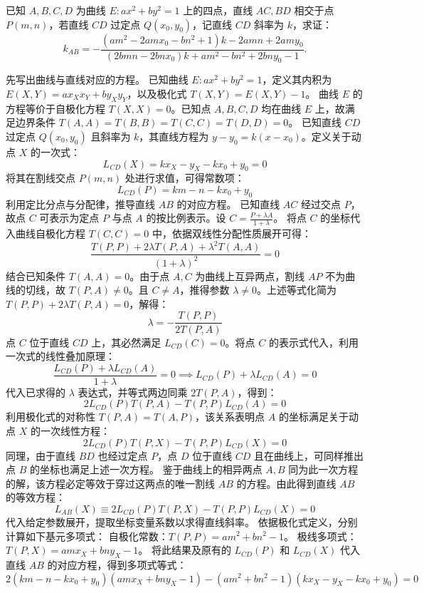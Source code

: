\begin{example}
已知 \(A,B,C,D\) 为曲线 \(E: ax^2 + by^2 = 1\) 上的四点，直线 \(AC,BD\) 相交于点 \(P(m,n)\)，若直线 \(CD\) 过定点 \(Q(x_0,y_0)\)，记直线 \(CD\) 斜率为 \(k\)，求证：
\[
k_{AB} = -\frac{\left(am^2 - 2amx_0 - bn^2 + 1\right)k - 2amn + 2amy_0}{\left(2bmn - 2bnx_0\right)k + am^2 - bn^2 + 2bny_0 - 1}.
\]
\end{example}
\begin{solution}
先写出曲线与直线对应的方程。
已知曲线 $E: ax^2 + by^2 = 1$，定义其内积为 $E(X,Y) = a x_X x_Y + b y_X y_Y$，以及极化式 $T(X,Y) = E(X,Y) - 1$。
曲线 $E$ 的方程等价于自极化方程 $T(X,X) = 0$。已知点 $A,B,C,D$ 均在曲线 $E$ 上，故满足边界条件 $T(A,A) = T(B,B) = T(C,C) = T(D,D) = 0$。
已知直线 $CD$ 过定点 $Q(x_0,y_0)$ 且斜率为 $k$，其直线方程为 $y - y_0 = k(x - x_0)$。定义关于动点 $X$ 的一次式：
\[ L_{CD}(X) = kx_X - y_X - kx_0 + y_0 = 0 \]
将其在割线交点 $P(m,n)$ 处进行求值，可得常数项：
\[ L_{CD}(P) = km - n - kx_0 + y_0 \]
利用定比分点与分配律，推导直线 $AB$ 的对应方程。
已知直线 $AC$ 经过交点 $P$，故点 $C$ 可表示为定点 $P$ 与点 $A$ 的按比例表示。设 $C = \frac{P + \lambda A}{1+\lambda}$。
将点 $C$ 的坐标代入曲线自极化方程 $T(C,C) = 0$ 中，依据双线性分配性质展开可得：
\[ \frac{T(P,P) + 2\lambda T(P,A) + \lambda^2 T(A,A)}{(1+\lambda)^2} = 0 \]
结合已知条件 $T(A,A) = 0$。由于点 $A,C$ 为曲线上互异两点，割线 $AP$ 不为曲线的切线，故 $T(P,A) \neq 0$。且 $C \neq A$，推得参数 $\lambda \neq 0$。上述等式化简为 $T(P,P) + 2\lambda T(P,A) = 0$，解得：
\[ \lambda = -\frac{T(P,P)}{2T(P,A)} \]
点 $C$ 位于直线 $CD$ 上，其必然满足 $L_{CD}(C) = 0$。将点 $C$ 的表示式代入，利用一次式的线性叠加原理：
\[ \frac{L_{CD}(P) + \lambda L_{CD}(A)}{1+\lambda} = 0 \implies L_{CD}(P) + \lambda L_{CD}(A) = 0 \]
代入已求得的 $\lambda$ 表达式，并等式两边同乘 $2T(P,A)$，得到：
\[ 2L_{CD}(P)T(P,A) - T(P,P)L_{CD}(A) = 0 \]
利用极化式的对称性 $T(P,A) = T(A,P)$，该关系表明点 $A$ 的坐标满足关于动点 $X$ 的一次线性方程：
\[ 2L_{CD}(P)T(P,X) - T(P,P)L_{CD}(X) = 0 \]
同理，由于直线 $BD$ 也经过定点 $P$，点 $D$ 位于直线 $CD$ 且在曲线上，可同样推出点 $B$ 的坐标也满足上述一次方程。
鉴于曲线上的相异两点 $A, B$ 同为此一次方程的解，该方程必定等效于穿过这两点的唯一割线 $AB$ 的方程。由此得到直线 $AB$ 的等效方程：
\[ L_{AB}(X) \equiv 2L_{CD}(P)T(P,X) - T(P,P)L_{CD}(X) = 0 \]
代入给定参数展开，提取坐标变量系数以求得直线斜率。
依据极化式定义，分别计算如下基元多项式：
自极化常数：$T(P,P) = am^2 + bn^2 - 1$。
极线多项式：$T(P,X) = amx_X + bny_X - 1$。
将此结果及原有的 $L_{CD}(P)$ 和 $L_{CD}(X)$ 代入直线 $AB$ 的对应方程，得到多项式等式：
\[ 2(km - n - kx_0 + y_0)(amx_X + bny_X - 1) - (am^2 + bn^2 - 1)(kx_X - y_X - kx_0 + y_0) = 0 \]

\end{solution}
